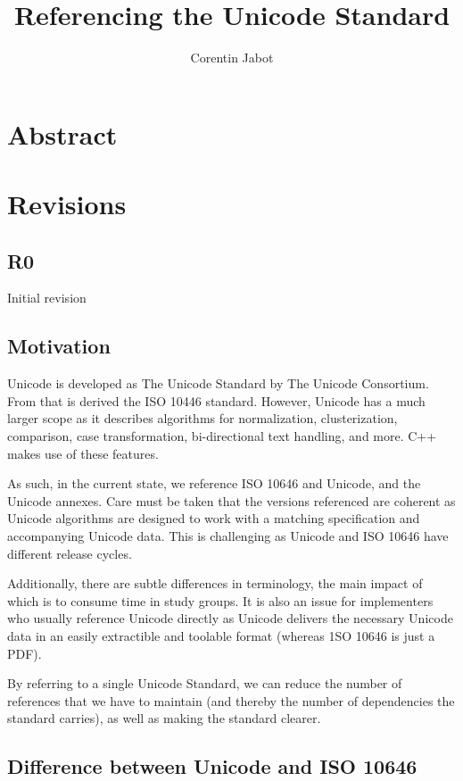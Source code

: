 \documentclass{wg21}
\title{Referencing the Unicode Standard}
\author{Corentin Jabot}{corentin.jabot@gmail.com}
\begin{document}
\maketitle

\section{Abstract}


\section{Revisions}

\subsection{R0}

Initial revision

\subsection{Motivation}

Unicode is developed as The Unicode Standard by The Unicode Consortium.
From that is derived the ISO 10446 standard.
However, Unicode has a much larger scope as it describes algorithms for normalization,
clusterization, comparison, case transformation, bi-directional text handling, and more.
C++ makes use of these features.

As such, in the current state, we reference ISO 10646 and Unicode, and the Unicode annexes.
Care must be taken that the versions referenced are coherent as Unicode algorithms
are designed to work with a matching specification and accompanying Unicode data.
This is challenging as Unicode and ISO 10646 have different release cycles.

Additionally, there are subtle differences in terminology, the main impact of which
is to consume time in study groups.
It is also an issue for implementers who usually reference
Unicode directly as Unicode delivers the necessary Unicode data in an easily extractible
and toolable format (whereas 1SO 10646 is just a PDF).

By referring to a single Unicode Standard, we can reduce the number of references
that we have to maintain (and thereby the number of dependencies the standard carries),
as well as making the standard clearer.

\subsection{Difference between Unicode and ISO 10646}
\end{document}
